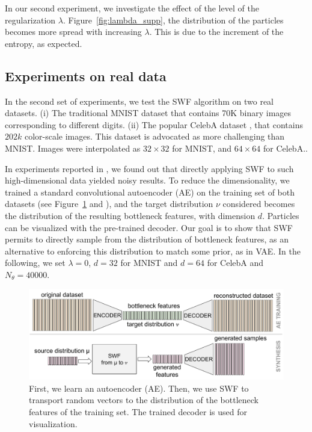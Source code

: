

In our second experiment, we investigate the effect of the level of the regularization $\lambda$. Figure~\ref{fig:lambda_supp}, the distribution of the particles becomes more spread with increasing $\lambda$. This is due to the increment of the entropy, as expected.

\subsection{Experiments on real data}

In the second set of experiments, we test the SWF algorithm on two real datasets. (i) The traditional MNIST dataset that contains 70K binary images corresponding to different digits. (ii) The popular CelebA dataset \cite{liu2015faceattributes}, that contains $202k$ color-scale images. This dataset is advocated as more challenging than MNIST. Images were interpolated as $32\times 32$ for MNIST, and $64\times 64$ for CelebA..

In experiments reported in \supp, we found out that directly applying SWF to such high-dimensional data yielded noisy results. To reduce the dimensionality, we trained a standard convolutional autoencoder (AE) on the training set of both datasets (see Figure~\ref{fig:using_ae} and \supp), and the target distribution $\nu$ considered becomes the distribution of the resulting bottleneck features,
with dimension $d$. Particles can be visualized with the pre-trained decoder.
Our goal is to show that SWF permits to directly sample from the distribution of bottleneck features, as an alternative to enforcing this distribution to match some prior, as in VAE. In the following, we set $\lambda=0$, $d=32$ for MNIST and $d=64$ for CelebA  and $N_\theta=40000$.

\begin{figure}
\centering
\includegraphics[width=0.99\columnwidth]{figures/generating_bottleneck_features.pdf}
\caption{First, we learn an autoencoder (AE). Then, we use SWF to transport random vectors to the distribution of the bottleneck features of the training set. The trained decoder is used for visualization.}
\label{fig:using_ae}
\vspace{-10pt}
\end{figure}


